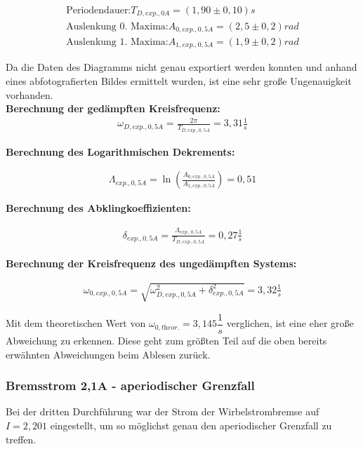 \documentclass[a4paper]{scrartcl}
\numberwithin{equation}{subsection}
\begin{document}
\begin{align*}
\text{Periodendauer:} T_{D,\textit{exp.},0A} = (1,90\pm0,10)s \\
\text{Auslenkung 0. Maxima:} A_{0,\textit{exp.},0,5A} = (2,5\pm0,2)rad \\
\text{Auslenkung 1. Maxima:} A_{1,\textit{exp.},0,5A} = (1,9\pm0,2)rad
\end{align*}

Da die Daten des Diagramms nicht genau exportiert werden konnten und anhand eines abfotografierten Bildes ermittelt wurden, ist eine sehr große Ungenauigkeit vorhanden. \\

\textbf{Berechnung der gedämpften Kreisfrequenz:}
\begin{align}
\omega_{D,\textit{exp.},0,5A} = \frac{2\pi}{T_{D,\textit{exp.},0,5A}} = 3,31 \frac{1}{s}
\end{align}

\textbf{Berechnung des Logarithmischen Dekrements:}

\begin{align}
\Lambda_{\textit{exp.},0,5A} = \ln(\frac{A_{0,\textit{exp.},0,5A}}{A_{1,\textit{exp.},0,5A}}) = 0,51
\end{align}

\textbf{Berechnung des Abklingkoeffizienten:}

\begin{align}
\delta_{\textit{exp.},0,5A} = \frac{\Lambda_{\textit{exp.},0,5A}}{T_{D,\textit{exp.},0,5A}} = 0,27 \frac{1}{s}
\end{align}

\textbf{Berechnung der Kreisfrequenz des ungedämpften Systems:}

\begin{align}
\omega_{0,\textit{exp.},0,5A} = \sqrt{\omega_{D,\textit{exp.},0,5A}^2 + \delta_{\textit{exp.},0,5A}^2} = 3,32 \frac{1}{s}
\end{align}

Mit dem theoretischen Wert von $\omega_{0,\textit{theor.}} = 3,145 \dfrac{1}{s}$ verglichen, ist eine eher große Abweichung zu erkennen. Diese geht zum größten Teil auf die oben bereits erwähnten Abweichungen beim Ablesen zurück.

\subsubsection{Bremsstrom 2,1A - aperiodischer Grenzfall}
Bei der dritten Durchführung war der Strom der Wirbelstrombremse auf $I = 2,201$ eingestellt, um so möglichst genau den aperiodischer Grenzfall zu treffen.
\end{document}
